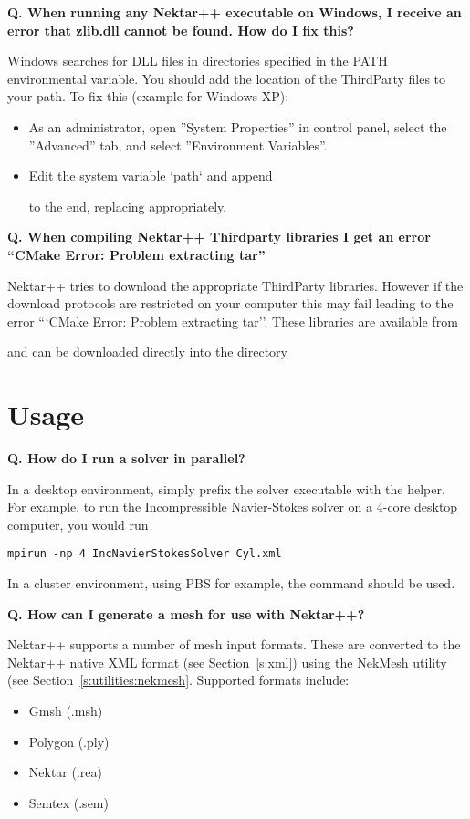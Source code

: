 \textbf{Q. When running any Nektar++ executable on Windows, I receive an error
that zlib.dll cannot be found. How do I fix this?}

Windows searches for DLL files in directories specified in the PATH
environmental variable. You should add the location of the ThirdParty files to
your path. To fix this (example for Windows XP):
\begin{itemize}
\item As an administrator, open ''System Properties'' in control panel, select
the ''Advanced'' tab, and select ''Environment Variables''.
\item Edit the system variable `path` and append


to the end, replacing
 appropriately.
\end{itemize}


\textbf{Q. When compiling Nektar++ Thirdparty libraries I get an error ``CMake Error: Problem extracting tar''}

Nektar++ tries to download the appropriate ThirdParty
libraries. However if the download protocols are restricted on your
computer this may fail leading to the error ```CMake Error: Problem
extracting tar''. These libraries are available from

\hspace{1cm} 

 and can be downloaded directly into the
 directory

\section{Usage}
\textbf{Q. How do I run a solver in parallel?}

In a desktop environment, simply prefix the solver executable with the
 helper. For example, to run the Incompressible Navier-Stokes
solver on a 4-core desktop computer, you would run
\begin{lstlisting}[style=BashInputStyle]
mpirun -np 4 IncNavierStokesSolver Cyl.xml
\end{lstlisting}
In a cluster environment, using PBS for example, the  command
should be used.


\textbf{Q. How can I generate a mesh for use with Nektar++?}

Nektar++ supports a number of mesh input formats. These are converted to the
Nektar++ native XML format (see Section~\ref{s:xml}) using the
NekMesh utility (see Section~\ref{s:utilities:nekmesh}. Supported
formats include:
\begin{itemize}
\item Gmsh (.msh)
\item Polygon (.ply)
\item Nektar (.rea)
\item Semtex (.sem)
\end{itemize}
